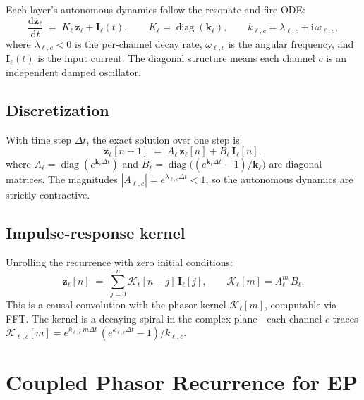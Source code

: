 \documentclass[11pt]{article}
\newcommand{\im}{\mathrm{i}}
\newcommand{\dd}{\mathrm{d}}
\newcommand{\dt}{\Delta t}
\theoremstyle{definition}
\DeclareMathOperator{\diag}{diag}
\begin{document}
Each layer's autonomous dynamics follow the resonate-and-fire ODE:
\begin{equation}\label{eq:rf-ode}
  \frac{\dd\bm{z}_\ell}{\dd t}
  \;=\;
  K_\ell\,\bm{z}_\ell + \bm{I}_\ell(t),
  \qquad
  K_\ell = \diag(\bm{k}_\ell),
  \qquad
  k_{\ell,c} = \lambda_{\ell,c} + \im\,\omega_{\ell,c},
\end{equation}
where $\lambda_{\ell,c}<0$ is the per-channel decay rate,
$\omega_{\ell,c}$ is the angular frequency, and $\bm{I}_\ell(t)$ is
the input current.  The diagonal structure means each channel $c$ is an
independent damped oscillator.

\subsection{Discretization}

With time step $\dt$, the exact solution over one step is
\begin{equation}\label{eq:discretize}
  \bm{z}_\ell[n+1]
  \;=\;
  A_\ell\,\bm{z}_\ell[n] + B_\ell\,\bm{I}_\ell[n],
\end{equation}
where $A_\ell = \diag(e^{\bm{k}_\ell\dt})$ and
$B_\ell = \diag\!\bigl((e^{\bm{k}_\ell\dt}-1)/\bm{k}_\ell\bigr)$
are diagonal matrices.  The magnitudes $|A_{\ell,c}|=e^{\lambda_{\ell,c}\dt}<1$,
so the autonomous dynamics are strictly contractive.

\subsection{Impulse-response kernel}

Unrolling the recurrence with zero initial conditions:
\begin{equation}\label{eq:kernel}
  \bm{z}_\ell[n]
  \;=\;
  \sum_{j=0}^{n} \mathcal{K}_\ell[n-j]\,\bm{I}_\ell[j],
  \qquad
  \mathcal{K}_\ell[m] = A_\ell^m\,B_\ell.
\end{equation}
This is a causal convolution with the phasor kernel
$\mathcal{K}_\ell[m]$, computable via FFT.  The kernel is a decaying
spiral in the complex plane---each channel $c$ traces
$\mathcal{K}_{\ell,c}[m] = e^{k_{\ell,c}\,m\dt}\,(e^{k_{\ell,c}\dt}-1)/k_{\ell,c}$.

\section{Coupled Phasor Recurrence for EP}\label{sec:coupled}
\end{document}
